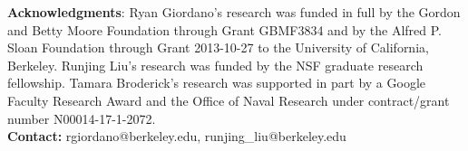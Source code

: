 \documentclass[a0,plainsections,30pt]{sciposter}\usepackage[]{graphicx}\usepackage[]{color}
\begin{document}
\begin{center}
\begin{minipage}[t]{\textwidth}
\small{
{\bf Acknowledgments}:
Ryan Giordano's research was funded in full by the
Gordon and Betty Moore Foundation through Grant GBMF3834 and by the Alfred P. Sloan Foundation through Grant 2013-10-27 to the University of California, Berkeley. Runjing Liu's research was funded by the NSF graduate research fellowship. Tamara Broderick's research was supported in part by a Google Faculty Research Award and the Office of Naval Research under contract/grant number N00014-17-1-2072.\\
{\bf Contact: } rgiordano@berkeley.edu, runjing\_liu@berkeley.edu
}
\end{minipage}
\end{center}
\end{document}
